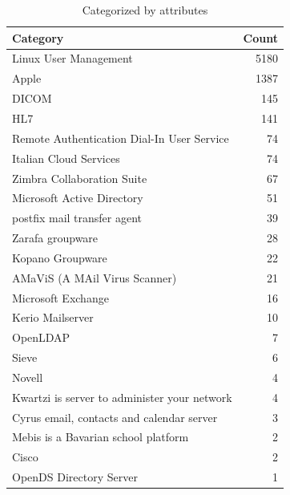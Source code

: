 \begin{table}[htbp]
\centering
\begin{tabular}{l r}
\toprule
\textbf{Category} & \textbf{Count} \\
\midrule
\midrule
Linux User Management & 5180 \\
Apple & 1387 \\
DICOM & 145 \\
HL7 & 141 \\
Remote Authentication Dial-In User Service & 74 \\
Italian Cloud Services & 74 \\
Zimbra Collaboration Suite & 67 \\
Microsoft Active Directory & 51 \\
postfix mail transfer agent & 39 \\
Zarafa groupware & 28 \\
Kopano Groupware & 22 \\
AMaViS (A MAil Virus Scanner) & 21 \\
Microsoft Exchange & 16 \\
Kerio Mailserver & 10 \\
OpenLDAP & 7 \\
Sieve & 6 \\
Novell & 4 \\
Kwartzi is server to administer your network & 4 \\
Cyrus email, contacts and calendar server & 3 \\
Mebis is a Bavarian school platform & 2 \\
Cisco & 2 \\
OpenDS Directory Server & 1 \\
\bottomrule
\end{tabular}
\caption{Categorized by attributes}
\label{tab:CatByAtt}
\end{table}